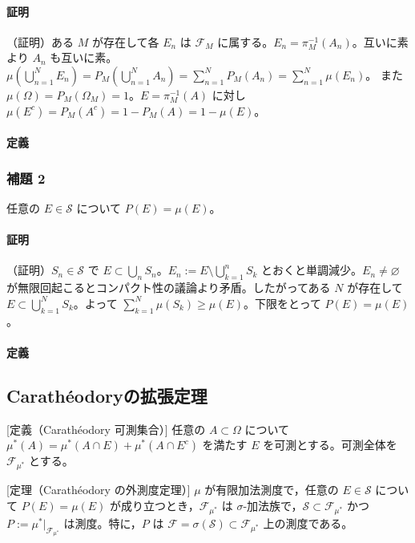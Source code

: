 \documentclass[uplatex,dvipdfmx,11pt,a4paper,openany]{bxjsbook}
\begin{document}
\paragraph{証明}
（証明）ある \(M\) が存在して各 \(E_n\) は \(\mathcal{F}_M\) に属する。\(E_n=\pi_M^{-1}(A_n)\)。互いに素より \(A_n\) も互いに素。
                                \(\mu\left(\bigcup_{n=1}^N E_n\right)=P_M\left(\bigcup_{n=1}^N A_n\right)=\sum_{n=1}^N P_M(A_n)=\sum_{n=1}^N \mu(E_n)\)。
                                また \(\mu(\Omega)=P_M(\Omega_M)=1\)。\(E=\pi_M^{-1}(A)\) に対し \(\mu(E^c)=P_M(A^c)=1-P_M(A)=1-\mu(E)\)。



\paragraph{定義}
\subsubsection{補題 2}
任意の \(E\in \mathcal{S}\) について \(P(E)=\mu(E)\)。

\paragraph{証明}
（証明）\(S_n\in\mathcal{S}\) で \(E\subset \bigcup_{n} S_n\)。\(E_n:=E\setminus \bigcup_{k=1}^n S_k\) とおくと単調減少。\(E_n\neq\varnothing\) が無限回起こるとコンパクト性の議論より矛盾。したがってある \(N\) が存在して \(E\subset \bigcup_{k=1}^N S_k\)。よって \(\sum_{k=1}^N \mu(S_k)\ge \mu(E)\)。下限をとって \(P(E)=\mu(E)\)。



\paragraph{定義}
\subsection{Carathéodoryの拡張定理}
[定義（Carathéodory 可測集合）] 任意の \(A\subset\Omega\) について \(\mu^{\ast}(A)=\mu^{\ast}(A\cap E)+\mu^{\ast}(A\cap E^c)\) を満たす \(E\) を可測とする。可測全体を \(\mathcal{F}_{\mu^{\ast}}\) とする。

[定理（Carathéodory の外測度定理）] \(\mu\) が有限加法測度で，任意の \(E\in \mathcal{S}\) について \(P(E)=\mu(E)\) が成り立つとき，\(\mathcal{F}_{\mu^{\ast}}\) は \(\sigma\)-加法族で，\(\mathcal{S}\subset \mathcal{F}_{\mu^{\ast}}\) かつ \(P:=\mu^{\ast}\big|_{\mathcal{F}_{\mu^{\ast}}}\) は測度。特に，\(P\) は \(\mathcal{F}=\sigma(\mathcal{S})\subset \mathcal{F}_{\mu^{\ast}}\) 上の測度である。
\end{document}
